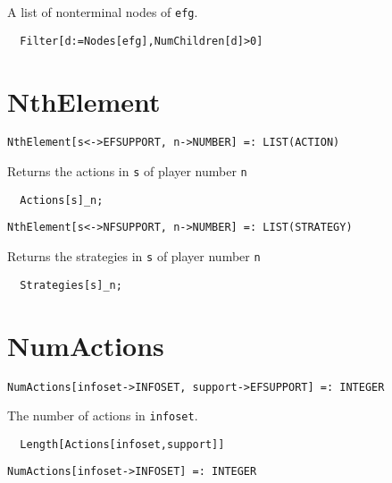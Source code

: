 \noindent
A list of nonterminal nodes of \verb+efg+.

\udfbody
\begin{verbatim}
  Filter[d:=Nodes[efg],NumChildren[d]>0]
\end{verbatim} 


\section*{NthElement}\label{ExtNthElement}
\begin{verbatim}
NthElement[s<->EFSUPPORT, n->NUMBER] =: LIST(ACTION) 
\end{verbatim}

\noindent
Returns the actions in \verb+s+ of player number \verb+n+

\udfbody
\begin{verbatim}
  Actions[s]_n;
\end{verbatim} 

\newsignature

\begin{verbatim}
NthElement[s<->NFSUPPORT, n->NUMBER] =: LIST(STRATEGY) 
\end{verbatim}

\noindent
Returns the strategies in \verb+s+ of player number \verb+n+

\udfbody
\begin{verbatim}
  Strategies[s]_n;
\end{verbatim} 


\section*{NumActions}\label{ExtNumActions}
\begin{verbatim}
NumActions[infoset->INFOSET, support->EFSUPPORT] =: INTEGER 
\end{verbatim}

\noindent
The number of actions in \verb+infoset+.

\udfbody
\begin{verbatim}
  Length[Actions[infoset,support]] 
\end{verbatim} 

\newsignature

\begin{verbatim}
NumActions[infoset->INFOSET] =: INTEGER 
\end{verbatim}

